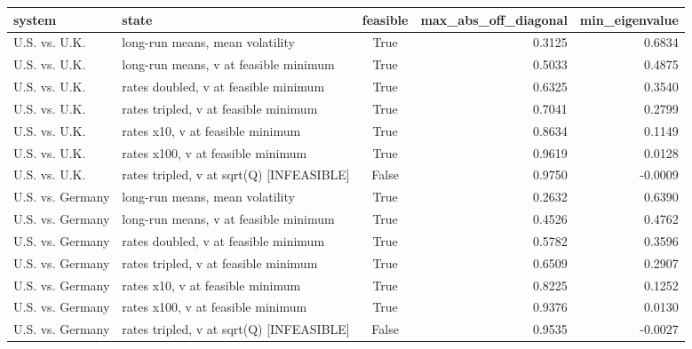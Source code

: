 \begin{tabular}{llcrr}
\toprule
system & state & feasible & max_abs_off_diagonal & min_eigenvalue \\
\midrule
U.S. vs. U.K. & long-run means, mean volatility & True & 0.3125 & 0.6834 \\
U.S. vs. U.K. & long-run means, v at feasible minimum & True & 0.5033 & 0.4875 \\
U.S. vs. U.K. & rates doubled, v at feasible minimum & True & 0.6325 & 0.3540 \\
U.S. vs. U.K. & rates tripled, v at feasible minimum & True & 0.7041 & 0.2799 \\
U.S. vs. U.K. & rates x10, v at feasible minimum & True & 0.8634 & 0.1149 \\
U.S. vs. U.K. & rates x100, v at feasible minimum & True & 0.9619 & 0.0128 \\
U.S. vs. U.K. & rates tripled, v at sqrt(Q) [INFEASIBLE] & False & 0.9750 & -0.0009 \\
U.S. vs. Germany & long-run means, mean volatility & True & 0.2632 & 0.6390 \\
U.S. vs. Germany & long-run means, v at feasible minimum & True & 0.4526 & 0.4762 \\
U.S. vs. Germany & rates doubled, v at feasible minimum & True & 0.5782 & 0.3596 \\
U.S. vs. Germany & rates tripled, v at feasible minimum & True & 0.6509 & 0.2907 \\
U.S. vs. Germany & rates x10, v at feasible minimum & True & 0.8225 & 0.1252 \\
U.S. vs. Germany & rates x100, v at feasible minimum & True & 0.9376 & 0.0130 \\
U.S. vs. Germany & rates tripled, v at sqrt(Q) [INFEASIBLE] & False & 0.9535 & -0.0027 \\
\bottomrule
\end{tabular}
